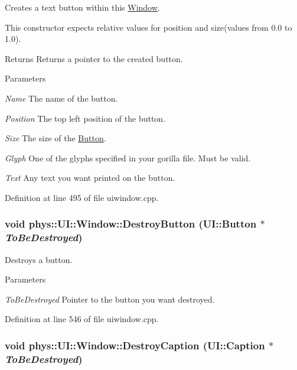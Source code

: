 Creates a text button within this \hyperlink{classphys_1_1UI_1_1Window}{Window}. 

This constructor expects relative values for position and size(values from 0.0 to 1.0). \begin{DoxyReturn}{Returns}
Returns a pointer to the created button. 
\end{DoxyReturn}

\begin{DoxyParams}{Parameters}
\item[{\em Name}]The name of the button. \item[{\em Position}]The top left position of the button. \item[{\em Size}]The size of the \hyperlink{classphys_1_1UI_1_1Button}{Button}. \item[{\em Glyph}]One of the glyphs specified in your gorilla file. Must be valid. \item[{\em Text}]Any text you want printed on the button. \end{DoxyParams}


Definition at line 495 of file uiwindow.cpp.

\hypertarget{classphys_1_1UI_1_1Window_a5a5bc10054d6e1d709b3b683a5554bf4}{
\subsubsection[{DestroyButton}]{\setlength{\rightskip}{0pt plus 5cm}void phys::UI::Window::DestroyButton ({\bf UI::Button} $\ast$ {\em ToBeDestroyed})}}
\label{d4/d86/classphys_1_1UI_1_1Window_a5a5bc10054d6e1d709b3b683a5554bf4}


Destroys a button. 


\begin{DoxyParams}{Parameters}
\item[{\em ToBeDestroyed}]Pointer to the button you want destroyed. \end{DoxyParams}


Definition at line 546 of file uiwindow.cpp.

\hypertarget{classphys_1_1UI_1_1Window_a4e3dbe56ca1efce7ac1d26ceb8f7e915}{
\subsubsection[{DestroyCaption}]{\setlength{\rightskip}{0pt plus 5cm}void phys::UI::Window::DestroyCaption ({\bf UI::Caption} $\ast$ {\em ToBeDestroyed})}}
\label{d4/d86/classphys_1_1UI_1_1Window_a4e3dbe56ca1efce7ac1d26ceb8f7e915}



